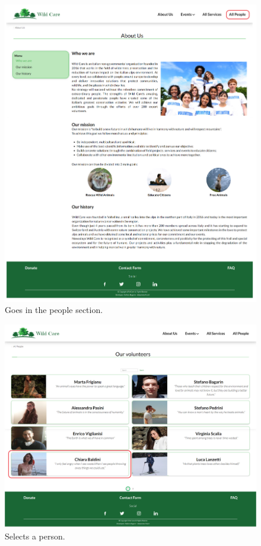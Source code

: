 	\begin{figure}[h!]
		\centering
		\begin{minipage}[b]{1\textwidth}
    			\includegraphics[width=\textwidth]{./assets/mockups/aboutus_people.png}
			\caption{Goes in the people section.}
		\end{minipage}
	\end{figure}

	\begin{figure}[h!]
		\centering
		\begin{minipage}[b]{1\textwidth}
    			\includegraphics[width=\textwidth]{./assets/mockups/people_persondetails.png}
			\caption{Selects a person.}
		\end{minipage}
	\end{figure}

